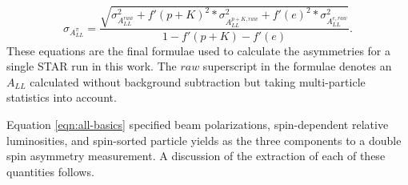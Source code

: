 \begin{equation}
  \sigma_{A_{LL}^{\pi}} = \frac{\sqrt{ \sigma_{A_{LL}^{raw}}^{2} + f'(p+K)^{2} * \sigma_{A_{LL}^{p+K,raw}}^{2} + f'(e)^{2} * \sigma_{A_{LL}^{e,raw}}^{2} }}{1 - f'(p+K) - f'(e)}.
  \label{eqn:sigma-all}
\end{equation}
%
These equations are the final formulae used to calculate the asymmetries for a single STAR run in this work.  The \(raw\) superscript in the formulae denotes an \(A_{LL}\) calculated without background subtraction but taking multi-particle statistics into account.

Equation \ref{eqn:all-basics} specified beam polarizations, spin-dependent relative luminosities, and spin-sorted particle yields as the three components to a double spin asymmetry measurement.  A discussion of the extraction of each of these quantities follows.